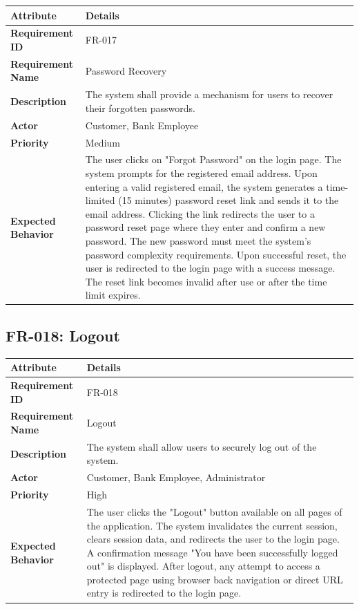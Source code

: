 \documentclass[12pt,a4paper,oneside]{report}
\begin{document}
\begin{table}[htbp]
\centering
\small
\begin{tabularx}{\textwidth}{l l}
\toprule
\textbf{Attribute} & \textbf{Details} \\
\midrule
\textbf{Requirement ID} & FR-017 \\
\textbf{Requirement Name} & Password Recovery \\
\textbf{Description} & The system shall provide a mechanism for users to recover their forgotten passwords. \\
\textbf{Actor} & Customer, Bank Employee \\
\textbf{Priority} & Medium \\
\textbf{Expected Behavior} & The user clicks on "Forgot Password" on the login page. The system prompts for the registered email address. Upon entering a valid registered email, the system generates a time-limited (15 minutes) password reset link and sends it to the email address. Clicking the link redirects the user to a password reset page where they enter and confirm a new password. The new password must meet the system's password complexity requirements. Upon successful reset, the user is redirected to the login page with a success message. The reset link becomes invalid after use or after the time limit expires. \\
\bottomrule
\end{tabularx}
\end{table}

\subsection{FR-018: Logout}

\begin{table}[htbp]
\centering
\small
\begin{tabularx}{\textwidth}{l l}
\toprule
\textbf{Attribute} & \textbf{Details} \\
\midrule
\textbf{Requirement ID} & FR-018 \\
\textbf{Requirement Name} & Logout \\
\textbf{Description} & The system shall allow users to securely log out of the system. \\
\textbf{Actor} & Customer, Bank Employee, Administrator \\
\textbf{Priority} & High \\
\textbf{Expected Behavior} & The user clicks the "Logout" button available on all pages of the application. The system invalidates the current session, clears session data, and redirects the user to the login page. A confirmation message "You have been successfully logged out" is displayed. After logout, any attempt to access a protected page using browser back navigation or direct URL entry is redirected to the login page. \\
\bottomrule
\end{tabularx}
\end{table}
\end{document}
